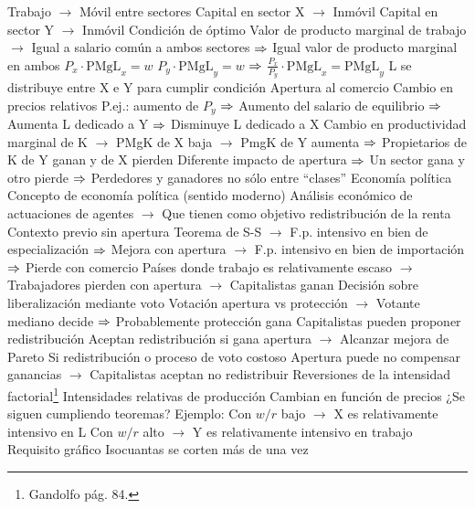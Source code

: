\documentclass{nuevotema}
\begin{document}
\begin{esquemal}
				\4[] Trabajo
				\4[] $\to$ Móvil entre sectores
				\4[] Capital en sector X
				\4[] $\to$ Inmóvil
				\4[] Capital en sector Y
				\4[] $\to$ Inmóvil
				\4 Condición de óptimo
				\4[] Valor de producto marginal de trabajo
				\4[] $\to$ Igual a salario común a ambos sectores
				\4[] $\Rightarrow$ Igual valor de producto marginal en ambos
				\4[] $P_x \cdot \text{PMgL}_x = w$
				\4[] $P_y \cdot \text{PMgL}_y = w$
				\4[] $\Rightarrow$ $\frac{P_x}{P_y} \cdot \text{PMgL}_x = \text{PMgL}_y$
				\4[] L se distribuye entre X e Y para cumplir condición
				\4[] 
				\4 Apertura al comercio
				\4[] Cambio en precios relativos
				\4[] P.ej.: aumento de $P_y$
				\4[] $\Rightarrow$ Aumento del salario de equilibrio
				\4[] $\Rightarrow$ Aumenta L dedicado a Y
				\4[] $\Rightarrow$ Disminuye L dedicado a X
				\4[] Cambio en productividad marginal de K
				\4[] $\to$ PMgK de X baja
				\4[] $\to$ PmgK de Y aumenta
				\4[] $\Rightarrow$ Propietarios de K de Y ganan y de X pierden
				\4[] Diferente impacto de apertura
				\4[] $\Rightarrow$ Un sector gana y otro pierde
				\4[] $\Rightarrow$ Perdedores y ganadores no sólo entre ``clases''
			\3 Economía política
				\4 Concepto de economía política (sentido moderno)
				\4[] Análisis económico de actuaciones de agentes
				\4[] $\to$ Que tienen como objetivo redistribución de la renta
				\4 Contexto previo sin apertura
				\4[] Teorema de S-S
				\4[] $\to$ F.p. intensivo en bien de especialización
				\4[] $\Rightarrow$ Mejora con apertura
				\4[] $\to$ F.p. intensivo en bien de importación
				\4[] $\Rightarrow$ Pierde con comercio
				\4[] Países donde trabajo es relativamente escaso
				\4[] $\to$ Trabajadores pierden con apertura
				\4[] $\to$ Capitalistas ganan
				\4 Decisión sobre liberalización mediante voto
				\4[] Votación apertura vs protección
				\4[] $\to$ Votante mediano decide
				\4[] $\Rightarrow$ Probablemente protección gana
				\4 Capitalistas pueden proponer redistribución
				\4[] Aceptan redistribución si gana apertura
				\4[] $\to$ Alcanzar mejora de Pareto
				\4 Si redistribución o proceso de voto costoso
				\4[] Apertura puede no compensar ganancias
				\4[] $\to$ Capitalistas aceptan no redistribuir
			\3 Reversiones de la intensidad factorial\footnote{Gandolfo pág. 84.}
				\4 Intensidades relativas de producción
				\4[] Cambian en función de precios
				\4[$\to$] ¿Se siguen cumpliendo teoremas?
				\4 Ejemplo:
				\4[] Con $w/r$ bajo
				\4[] $\to$ X es relativamente intensivo en L
				\4[] Con $w/r$ alto
				\4[] $\to$ Y es relativamente intensivo en trabajo
				\4 Requisito gráfico
				\4[] Isocuantas se corten más de una vez

\end{esquemal}
\end{document}
